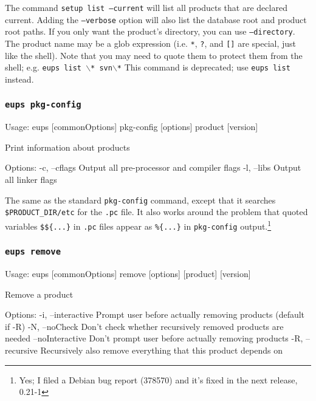 \documentclass{article}
\newcommand{\code}[1]{\texttt{#1}}
\let\overbatim=\verbatim
\let\oendverbatim=\endverbatim
\renewenvironment{verbatim}
{\center\minipage{16cm}\overbatim}
{\oendverbatim\endminipage\endcenter}
\begin{document}
The command \code{setup list --current} will list all products that
are declared current. Adding the \code{--verbose} option will also
list the database root and product root paths.  If you only want the product's
directory, you can use \code{--directory}.
The product name may be a glob expression (i.e. \code{*}, \code{?},
and \code{[]} are special, just like the shell).  Note that you may
need to quote them to protect them from the shell; e.g. \code{eups list $\backslash$* svn$\backslash$*}
This command is deprecated; use \code{eups list} instead.


\subsubsection{\code{eups pkg-config}}
\begin{verbatim}
Usage:
    eups [commonOptions] pkg-config [options] product [version]

Print information about products

Options:
   -c, --cflags            Output all pre-processor and compiler flags
   -l, --libs              Output all linker flags
\end{verbatim}

The same as the standard \code{pkg-config} command, except that it
searches \code{\$PRODUCT\_DIR/etc} for the \code{.pc} file.  It also
works around the problem that quoted variables \code{\$\$\{...\}}
in \code{.pc} files appear as \code{\%\{...\}} in \code{pkg-config} output.\footnote{
  Yes; I filed a Debian bug report (378570) and it's fixed in the next release, 0.21-1}
  

\subsubsection{\code{eups remove}}
\begin{verbatim}
Usage:
    eups [commonOptions] remove [options] [product] [version]

Remove a product

Options:
   -i, --interactive       Prompt user before actually removing products (default if -R)
   -N, --noCheck           Don't check whether recursively removed products are needed
       --noInteractive     Don't prompt user before actually removing products
   -R, --recursive         Recursively also remove everything that this product depends on
\end{verbatim}
\end{document}
